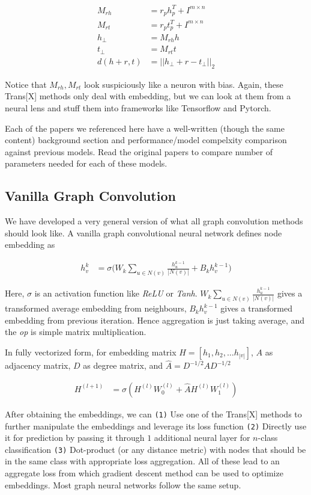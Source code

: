 \begin{align}
    M_{rh} &= r_p h_p^T + I^{m \times n} \\
    M_{rt} &= r_p t_p^T + I^{m \times n} \\
    h_{\perp} &= M_{rh}h \\
    t_{\perp} &= M_{rt}t \\
    d(h+r, t) &= ||h_{\perp} + r - t_{\perp}||_2
\end{align}{}

Notice that $M_{rh}, M_{rt}$ look suspiciously like a neuron with bias. Again, these Trans[X] methods only deal with embedding, but we can look at them from a neural lens and stuff them into frameworks like Tensorflow and Pytorch.

Each of the papers we referenced here have a well-written (though the same content) background section and performance/model compelxity comparison against previous models. Read the original papers to compare number of parameters needed for each of these models.

\subsection{Vanilla Graph Convolution}

We have developed a very general version of what all graph convolution methods should look like. A vanilla graph convolutional neural network defines node embedding as 

\begin{align}
    h_v^k &= \sigma\Big( W_k \sum_{u \in N(v)} \frac{h_u^{k-1}}{|N(v)|} + B_kh_v^{k-1} \Big)
\end{align}{}

Here, $\sigma$ is an activation function like \textit{ReLU} or \textit{Tanh}. $W_k \sum_{u \in N(v)} \frac{h_u^{k-1}}{|N(v)|}$ gives a transformed average embedding from neighbours, $B_kh_v^{k-1}$ gives a transformed embedding from previous iteration. Hence aggregation is just taking average, and the \textit{op} is simple matrix multiplication.

In fully vectorized form, for embedding matrix $H=[h_1, h_2, \dots h_{|v|}]$, $A$ as adjacency matrix, $D$ as degree matrix, and $\hat{A}=D^{-1/2}AD^{-1/2}$

\begin{align}
    H^{(l+1)} &= \sigma(H^{(l)}W_0^{(l)} + \hat{A}H^{(l)}W_1^{(l)})
\end{align}{}

After obtaining the embeddings, we can \texttt{(1)} Use one of the Trans[X] methods to further manipulate the embeddings and leverage its loss function \texttt{(2)} Directly use it for prediction by passing it through $1$ additional neural layer for $n$-class classification \texttt{(3)} Dot-product (or any distance metric) with nodes that should be in the same class with appropriate loss aggregation. All of these lead to an aggregate loss from which gradient descent method can be used to optimize embeddings. Most graph neural networks follow the same setup.

